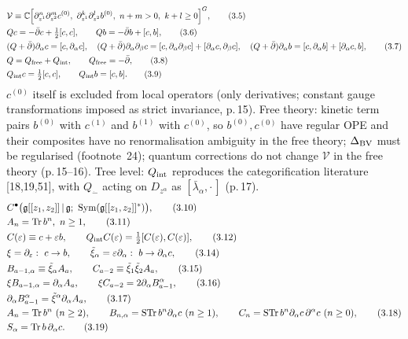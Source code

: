 \documentclass[11pt]{article}
\newcommand{\Tr}{\operatorname{Tr}}
\newcommand{\STr}{\operatorname{STr}}
\newcommand{\dm}{\dot{-}}
\newcommand{\pb}{\bar{\partial}}
\begin{document}
\begin{align}
&\mathcal V\equiv\mathbb C\Big[\partial^n_{z^1}\partial^m_{z^2}c^{(0)},\ \partial^k_{z^1}\partial^l_{z^2}b^{(0)},\ n+m>0,\ k+l\geq0\Big]^G, \tag{3.5}\\
&Qc=-\pb c+\tfrac12[c,c],\qquad Qb=-\pb b+[c,b], \tag{3.6}\\
&(Q+\pb)\partial_\alpha c=[c,\partial_\alpha c],\quad (Q+\pb)\partial_\alpha\partial_\beta c=[c,\partial_\alpha\partial_\beta c]+[\partial_\alpha c,\partial_\beta c],\quad (Q+\pb)\partial_\alpha b=[c,\partial_\alpha b]+[\partial_\alpha c,b], \tag{3.7}\\
&Q=Q_{\rm free}+Q_{\rm int},\qquad Q_{\rm free}=-\pb, \tag{3.8}\\
&Q_{\rm int}c=\tfrac12[c,c],\qquad Q_{\rm int}b=[c,b]. \tag{3.9}
\end{align}
$c^{(0)}$ itself is excluded from local operators (only derivatives; constant gauge transformations imposed as strict invariance, p.\,15). Free theory: kinetic term pairs $b^{(0)}$ with $c^{(1)}$ and $b^{(1)}$ with $c^{(0)}$, so $b^{(0)},c^{(0)}$ have regular OPE and their composites have no renormalisation ambiguity in the free theory; $\Delta_{\rm BV}$ must be regularised (footnote~24); quantum corrections do not change $\mathcal V$ in the free theory (p.\,15--16). Tree level: $Q_{\rm int}$ reproduces the categorification literature [18,19,51], with $Q_{\dm}$ acting on $D_{z^\alpha}$ as $[\bar\lambda_\alpha,\cdot\,]$ (p.\,17).
\begin{align}
&C^\bullet\big(\mathfrak g[[z_1,z_2]]\,|\,\mathfrak g;\ \mathrm{Sym}(\mathfrak g[[z_1,z_2]]^*)\big), \tag{3.10}\\
&A_n=\Tr b^n,\ n\geq1, \tag{3.11}\\
&C(\varepsilon)\equiv c+\varepsilon b,\qquad Q_{\rm int}C(\varepsilon)=\tfrac12[C(\varepsilon),C(\varepsilon)], \tag{3.12}\\
&\xi=\partial_\varepsilon:\ c\to b,\qquad \tilde\xi_\alpha=\varepsilon\partial_\alpha:\ b\to\partial_\alpha c, \tag{3.14}\\
&B_{a-1,\alpha}\equiv\tilde\xi_\alpha A_a,\qquad C_{a-2}\equiv\tilde\xi_1\tilde\xi_2A_a, \tag{3.15}\\
&\xi B_{a-1,\alpha}=\partial_\alpha A_a,\qquad \xi C_{a-2}=2\partial_\alpha B^\alpha_{a-1}, \tag{3.16}\\
&\partial_\alpha B^\alpha_{a-1}=\tilde\xi^\alpha\partial_\alpha A_a, \tag{3.17}\\
&A_n=\Tr b^n\ (n\geq2),\qquad B_{n,\alpha}=\STr b^n\partial_\alpha c\ (n\geq1),\qquad C_n=\STr b^n\partial_\alpha c\,\partial^\alpha c\ (n\geq0), \tag{3.18}\\
&S_\alpha=\Tr b\,\partial_\alpha c. \tag{3.19}
\end{align}
\end{document}

